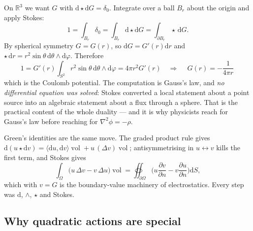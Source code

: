 \documentclass[10pt,a4paper]{article}
\newcommand{\dd}{\mathrm{d}}
\newcommand{\R}{\mathbb{R}}
\newcommand{\pd}[2]{\frac{\partial #1}{\partial #2}}
\DeclareMathOperator{\vol}{vol}
\newcommand{\pair}[2]{\langle #1 , #2 \rangle}
\theoremstyle{plain}
\theoremstyle{definition}
\numberwithin{equation}{section}
\begin{document}
On $\R^3$ we want $G$ with $\dd\!\star\!\dd G=\delta_0$. Integrate over a ball $B_r$ about the
origin and apply Stokes:
\begin{equation}
1=\int_{B_r}\delta_0=\int_{B_r}\dd\!\star\!\dd G=\int_{\partial B_r}\star\,\dd G .
\end{equation}
By spherical symmetry $G=G(r)$, so $\dd G=G'(r)\dd r$ and
$\star\,\dd r=r^2\sin\theta\,\dd\theta\wedge\dd\varphi$. Therefore
\begin{equation}
1=G'(r)\int_{S^2}r^2\sin\theta\,\dd\theta\wedge\dd\varphi=4\pi r^2G'(r)
\quad\Longrightarrow\quad
\boxed{\ G(r)=-\frac{1}{4\pi r}\ }
\end{equation}
which is the Coulomb potential. The computation is Gauss's law, and \emph{no differential
equation was solved}: Stokes converted a local statement about a point source into an algebraic
statement about a flux through a sphere. That is the practical content of the whole duality ---
and it is why physicists reach for Gauss's law before reaching for $\nabla^2\phi=-\rho$.

Green's identities are the same move. The graded product rule gives
$\dd(u\star\dd v)=\pair{\dd u}{\dd v}\vol+u\,(\Delta v)\vol$; antisymmetrising in
$u\leftrightarrow v$ kills the first term, and Stokes gives
\begin{equation}
\int_\Omega\big(u\,\Delta v-v\,\Delta u\big)\vol
=\oiint_{\partial\Omega}\Big(u\pd{v}{n}-v\pd{u}{n}\Big)\dd S ,
\end{equation}
which with $v=G$ is the boundary-value machinery of electrostatics. Every step was $\dd$,
$\wedge$, $\star$ and Stokes.

\subsection{Why quadratic actions are special}
\label{sec:quadratic}
\end{document}

